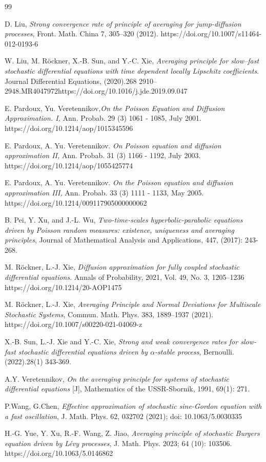 \documentclass[11pt,reqno]{amsart}
\numberwithin{equation}{section}
\begin{document}
\begin{thebibliography}{99}
	
D. Liu, \textit{Strong convergence rate of principle of averaging for jump-diffusion processes}, Front. Math. China 7, 305–320 (2012). https://doi.org/10.1007/s11464-012-0193-6	
	
W. Liu,  M. Röckner, X.-B. Sun, and  Y.-C. Xie, \textit{Averaging principle for slow–fast stochastic differential equations with time dependent locally Lipschitz coefficients}.  Journal  Differential Equations, (2020).268 2910–2948.MR4047972https://doi.org/10.1016/j.jde.2019.09.047

E. Pardoux, Yu. Veretennikov,\textit{On the Poisson Equation and Diffusion Approximation. I,} Ann. Probab. 29 (3) 1061 - 1085, July 2001. https://doi.org/10.1214/aop/1015345596

E. Pardoux, A. Yu. Veretennikov. \textit{On Poisson equation and diffusion approximation II,} Ann. Probab. 31 (3) 1166 - 1192, July 2003. https://doi.org/10.1214/aop/1055425774

E. Pardoux, A. Yu. Veretennikov. \textit{On the Poisson equation and diffusion approximation III,} Ann. Probab. 33 (3) 1111 - 1133, May 2005. https://doi.org/10.1214/009117905000000062

B. Pei, Y. Xu, and J.-L. Wu, \textit{Two-time-scales hyperbolic-parabolic equations driven by Poisson random measures: existence, uniqueness and averaging principles}, Journal of Mathematical Analysis and Applications, 447, (2017): 243-268.

M. Röckner, L.-J. Xie, \textit{Diffusion approximation for fully coupled stochastic differential equations}.  Annals of Probability,
2021, Vol. 49, No. 3, 1205–1236
https://doi.org/10.1214/20-AOP1475



M. Röckner, L.-J. Xie, \textit{Averaging Principle and Normal Deviations for Multiscale Stochastic Systems}, Commun. Math. Phys. 383, 1889–1937 (2021). https://doi.org/10.1007/s00220-021-04069-z


X.-B. Sun, L.-J. Xie and Y.-C. Xie, \textit{ Strong and weak convergence rates for slow-fast stochastic differential equations driven by $\alpha$-stable process}, Bernoulli.  (2022).28(1) 343-369.


A.Y. Veretennikov, \textit{On the averaging principle for systems of stochastic differential equations} [J], Mathematics of the USSR-Sbornik, 1991, 69(1): 271.



P.Wang, G.Chen, \textit{Effective approximation of stochastic sine-Gordon equation with a fast oscillation}, J. Math. Phys. 62, 032702 (2021); doi: 10.1063/5.0030335

H.-G. Yue, Y. Xu, R.-F. Wang, Z. Jiao, \textit{Averaging principle of stochastic Burgers equation driven by Lévy processes}, J. Math. Phys.  2023; 64 (10): 103506. https://doi.org/10.1063/5.0146862







\end{thebibliography}
\end{document}

